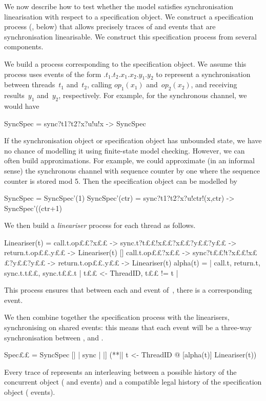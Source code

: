 We now describe how to test whether the model satisfies synchronisation
linearisation with respect to a specification object.  We construct a
specification process (, below) that allows precisely traces of
 and  events that are synchronisation linearisable.
We construct this specification process from several components.

We build a process  corresponding to the specification object.
We assume this process uses events of the form
$.t_1.t_2.x_1.x_2.y_1.y_2$ to represent a synchronisation between
threads~$t_1$ and~$t_2$, calling $op_1(x_1)$ and~$op_2(x_2)$, and receiving
results~$y_1$ and~$y_2$, respectively.  For example, for the synchronous
channel, we would have
%
\begin{cspm}
SyncSpec = sync?t1?t2?x?u!u!x -> SyncSpec
\end{cspm}

If the synchronisation object or specification object has unbounded state, we
have no chance of modelling it using finite-state model checking.  However, we
can often build approximations.  For example, we could approximate (in an
informal sense) the synchronous channel with sequence counter by one where the
sequence counter is stored mod 5.  Then the specification object can
be modelled by
%
\begin{cspm}
SyncSpec = SyncSpec'(1)
SyncSpec'(ctr) = sync?t1?t2?x?u!ctr!(x,ctr) -> SyncSpec'((ctr+1)%
\end{cspm}

We then build a \emph{lineariser} process for each thread as follows.
%
\begin{cspm}
Lineariser(t) = 
  call.t.op££?x££ -> sync.t?t££!x££?x££?y££?y££ -> return.t.op££.y££ -> Lineariser(t)
  []
  call.t.op££?x££ -> sync?t££!t?x££!x££?y££?y££ -> return.t.op££.y££ -> Lineariser(t)
alpha(t) = {| call.t, return.t, sync.t.t££, sync.t££.t | t££ <- ThreadID, t££ != t |} 
\end{cspm}
%
This process ensures that between each  and  event
of~, there is a corresponding  event.  

We then combine together the specification process with the linearisers,
synchronising on shared events: this means that each
 event will be a three-way synchronisation between
, \CSPM{)} and
\CSPM{)}.  
\begin{cspm}
Spec££ = SyncSpec [| {| sync |} |] (**|| t <- ThreadID @ [alpha(t)] Lineariser(t))
\end{cspm}
Every trace of  represents an interleaving between a possible
history of the concurrent object ( and  events) and a
compatible legal history of the specification object ( events).

